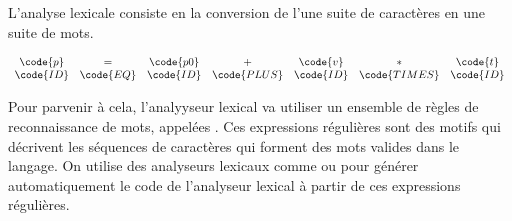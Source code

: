 L'analyse lexicale consiste en la conversion de l'une suite de caractères en une suite de mots.

\begin{exemple}{}{}

\[
\begin{array}{ccccccc}
\code{p} & = & \code{p0} & + & \code{v} & * & \code{t} \\
\code{ID} & \code{EQ} & \code{ID} & \code{PLUS} & \code{ID} & \code{TIMES} & \code{ID}
\end{array}
\]
\end{exemple}

Pour parvenir à cela, l'analyyseur lexical va utiliser un ensemble de règles de reconnaissance de mots, appelées . Ces expressions régulières sont des motifs qui décrivent les séquences de caractères qui forment des mots valides dans le langage. On utilise des analyseurs lexicaux comme  ou  pour générer automatiquement le code de l'analyseur lexical à partir de ces expressions régulières.
